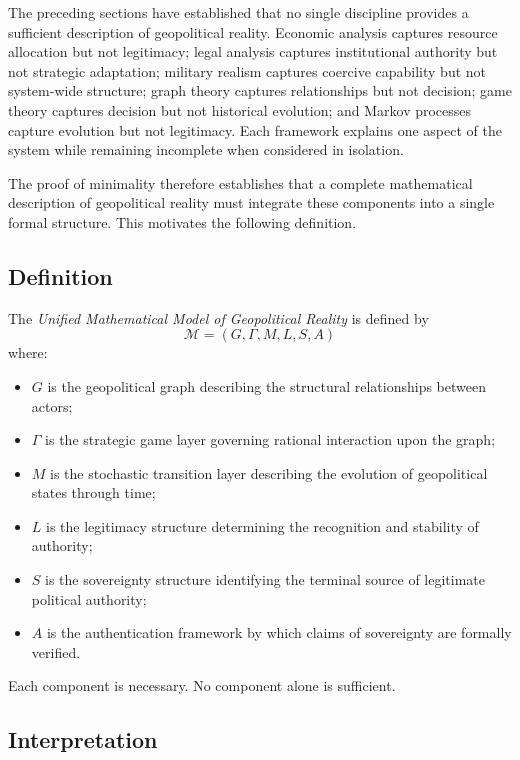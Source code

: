 \documentclass[11pt,openany]{book}
\theoremstyle{plain}
\theoremstyle{definition}
\begin{document}
The preceding sections have established that no single discipline provides a sufficient description of geopolitical reality. Economic analysis captures resource allocation but not legitimacy; legal analysis captures institutional authority but not strategic adaptation; military realism captures coercive capability but not system-wide structure; graph theory captures relationships but not decision; game theory captures decision but not historical evolution; and Markov processes capture evolution but not legitimacy. Each framework explains one aspect of the system while remaining incomplete when considered in isolation.

The proof of minimality therefore establishes that a complete mathematical description of geopolitical reality must integrate these components into a single formal structure. This motivates the following definition.

\subsection*{Definition}

The \emph{Unified Mathematical Model of Geopolitical Reality} is defined by
\[
\boxed{
\mathcal{M} = (G,\Gamma,M,L,S,A)
}
\]
where:
\begin{itemize}
    \item \(G\) is the geopolitical graph describing the structural relationships between actors;
    \item \(\Gamma\) is the strategic game layer governing rational interaction upon the graph;
    \item \(M\) is the stochastic transition layer describing the evolution of geopolitical states through time;
    \item \(L\) is the legitimacy structure determining the recognition and stability of authority;
    \item \(S\) is the sovereignty structure identifying the terminal source of legitimate political authority;
    \item \(A\) is the authentication framework by which claims of sovereignty are formally verified.
\end{itemize}

Each component is necessary. No component alone is sufficient.

\subsection*{Interpretation}
\end{document}
